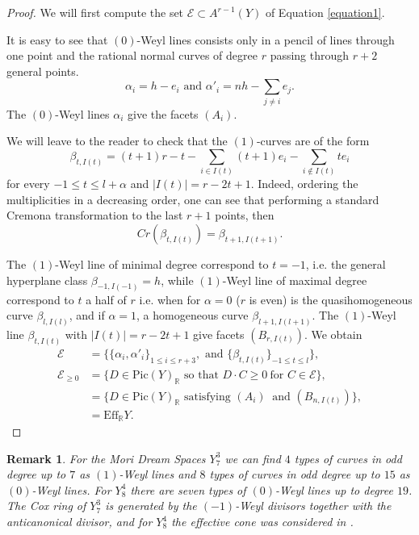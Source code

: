 \documentclass[12pt]{article}
\newtheorem{remark}[equation]{Remark}
\numberwithin{equation}{section}
\numberwithin{subeq}{equation}
\def\bbR{\mathbb{R}}
\begin{document}
\begin{proof}
We will first compute the set $\mathcal{E} \subset A^{r-1}(Y)$ of Equation \eqref{equation1}.

It is easy to see that $(0)$-Weyl lines consists only in a pencil of lines through one point and the rational normal curves of degree $r$ passing through $r+2$ general points.
\[
\alpha_{i}=h-e_i \text{  and  } \alpha'_{i}=nh - \sum_{j\neq i} e_j.
\]
The $(0)$-Weyl lines $\alpha_{i}$ give the facets $(A_{i})$.

We will leave to the reader to check that the $(1)$-curves are of the form
\[
\beta_{t, I(t)} = (t+1)r-t - \sum_{i\in I(t)} (t+1)e_i -  \sum_{i\notin I(t)} t e_i
\]
for every $-1\leq t\leq l+\alpha$ and $|I(t)|=r-2t+1$.
Indeed, ordering the multiplicities in a decreasing order,
one can see that performing a standard Cremona transformation to the last $r+1$ points, then
\[
Cr(\beta_{t, I(t)}) = \beta_{t+1, I(t+1)}.
\]

The $(1)$-Weyl line of minimal degree correspond to $t=-1$,
i.e. the general hyperplane class $\beta_{-1, I(-1)}=h$,
while $(1)$-Weyl line of maximal degree correspond to $t$ a half of $r$
i.e. when
for $\alpha=0$ ($r$ is even) is the quasihomogeneous curve $\beta_{l, I(l)}$,
and if $\alpha=1$, a homogeneous curve $\beta_{l+1, I(l+1)}$.
The $(1)$-Weyl line $\beta_{t, I(t)}$ with $|I(t)|=r-2t+1$ give facets $(B_{r,I(t)})$.
We obtain
\begin{equation}
\begin{split}
 \mathcal{E}&=\{ \{\alpha_i, \alpha'_i\}_{1\leq i\leq r+3}, \text{ and } \{\beta_{t, I(t)}\}_{ -1 \leq t \leq l} \},\\
\mathcal{E}_{\geq 0}&=\{D\in \text{Pic}(Y)_{\bbR} \text{ so that } D \cdot C\geq 0\ \text{for } C\in \mathcal{E}\},\\
&=\{D\in \text{Pic}(Y)_{\bbR} \text{ satisfying } (A_{i})\ \text{ and } (B_{n,I(t)})\},\\
&= \text{Eff}_{\mathbb{R}} Y.
\end{split}
\end{equation}
\end{proof}

\begin{remark}
For the Mori Dream Spaces $Y^3_7$
we can find $4$ types of curves in odd degree up to $7$ as $(1)$-Weyl lines
and $8$ types of curves in odd degree up to $15$ as $(0)$-Weyl lines.
For $Y^4_8$ there are seven types of $(0)$-Weyl lines up to degree $19$.
The Cox ring of $Y^3_7$ is generated by the $(-1)$-Weyl divisors
together with the anticanonical divisor,
and for $Y^4_8$ the effective cone was considered in \cite{Cas2}.
\end{remark}
\end{document}
